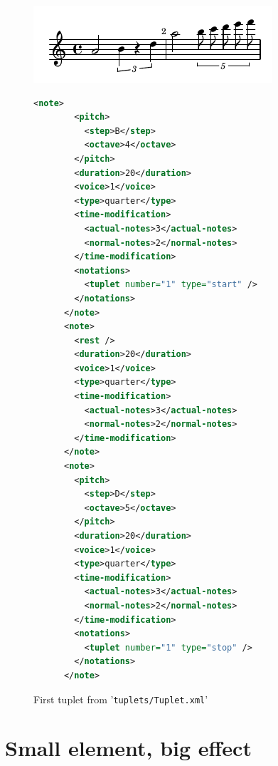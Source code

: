 \documentclass[12pt,a4paper]{article}
\begin{document}
\begin{figure}
\caption{First tuplet from {'\tt tuplets/Tuplet.xml}'}\label{tuplets}
\includegraphics{Tuplet.png}

\begin{lstlisting}[language=XML]
      <note>
        <pitch>
          <step>B</step>
          <octave>4</octave>
        </pitch>
        <duration>20</duration>
        <voice>1</voice>
        <type>quarter</type>
        <time-modification>
          <actual-notes>3</actual-notes>
          <normal-notes>2</normal-notes>
        </time-modification>
        <notations>
          <tuplet number="1" type="start" />
        </notations>
      </note>
      <note>
        <rest />
        <duration>20</duration>
        <voice>1</voice>
        <type>quarter</type>
        <time-modification>
          <actual-notes>3</actual-notes>
          <normal-notes>2</normal-notes>
        </time-modification>
      </note>
      <note>
        <pitch>
          <step>D</step>
          <octave>5</octave>
        </pitch>
        <duration>20</duration>
        <voice>1</voice>
        <type>quarter</type>
        <time-modification>
          <actual-notes>3</actual-notes>
          <normal-notes>2</normal-notes>
        </time-modification>
        <notations>
          <tuplet number="1" type="stop" />
        </notations>
      </note>
\end{lstlisting}
\end{figure}


\section{Small element, big effect}
\end{document}
